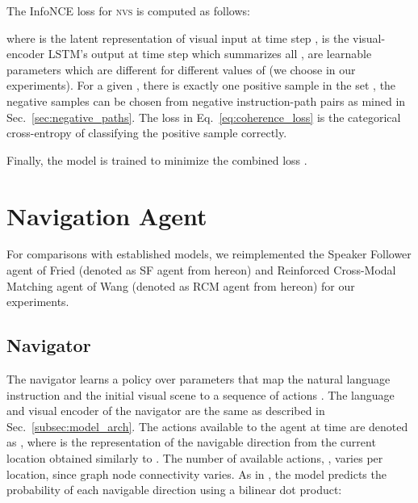 \documentclass[10pt,twocolumn,letterpaper]{article}
\newcommand{\tasknvs}{\textsc{nvs}}
\begin{document}
The InfoNCE \cite{Oord2018RepresentationLW} loss for {\tasknvs} is computed as follows:

\begin{small}

\end{small}

\noindent
where  is the latent representation of visual input at time step ,  is the visual-encoder LSTM's output at time step  which summarizes all ,  are learnable parameters which are different for different values of  (we choose  in our experiments). For a given , there is exactly one positive sample in the set , the negative samples can be chosen from negative instruction-path pairs as mined in Sec.~\ref{sec:negative_paths}. The loss in Eq.~\ref{eq:coherence_loss} is the categorical cross-entropy of classifying the positive sample correctly.

Finally, the model is trained to minimize the combined loss . 
 
\section{Navigation Agent}
\label{sec:navigation_agent}

For comparisons with established models, we reimplemented the Speaker Follower agent of Fried \etal \cite{Fried:2018:Speaker} (denoted as SF agent from hereon) and Reinforced Cross-Modal Matching agent of Wang \etal \cite{Wang:2018:RCM} (denoted as RCM agent from hereon) for our experiments.

\subsection{Navigator}
\label{sec:navigator}

The navigator learns a policy  over parameters  that map the natural language instruction  and the initial visual scene  to a sequence of actions . The language and visual encoder of the navigator are the same as described in Sec.~\ref{subsec:model_arch}. The actions available to the agent at time  are denoted as , where  is the representation of the navigable direction  from the current location obtained similarly to  \cite{Fried:2018:Speaker}. The number of available actions, , varies per location, since graph node connectivity varies. As in \cite{Wang:2018:RCM}, the model predicts the probability  of each navigable direction  using a bilinear dot product:

\begin{small}

\end{small}
\end{document}
